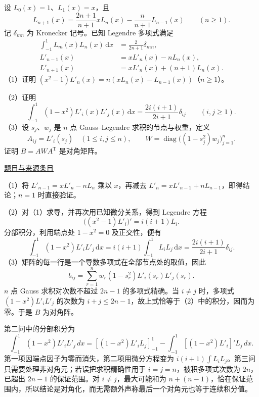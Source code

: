\documentclass[12pt,fontset=fandol]{ctexart}
\begin{document}
\begin{example}\label{ex:fin16-high:13}\label{pr:fin16-high:13}

设 $L_0(x)=1$、$L_1(x)=x$，且
\[
L_{n+1}(x)=\frac{2n+1}{n+1}xL_n(x)-\frac{n}{n+1}L_{n-1}(x)
\qquad(n\ge1).
\]
记 $\delta_{mn}$ 为 Kronecker 记号。已知 Legendre 多项式满足
\[
\begin{aligned}
\int_{-1}^1L_m(x)L_n(x)\,\mathrm dx&=\frac{2}{2n+1}\delta_{mn},\\
L'_{n-1}(x)&=xL'_n(x)-nL_n(x),\\
L'_{n+1}(x)&=xL'_n(x)+(n+1)L_n(x).
\end{aligned}
\]
（1）证明 $(x^2-1)L'_n(x)=n(xL_n(x)-L_{n-1}(x))$（$n\ge1$）。

（2）证明
\[
\int_{-1}^1(1-x^2)L'_i(x)L'_j(x)\,\mathrm dx
=\frac{2i(i+1)}{2i+1}\delta_{ij}\qquad(i,j\ge1).
\]
（3）设 $s_j$、$w_j$ 是 $n$ 点 Gauss--Legendre 求积的节点与权重，定义
\[
A_{ij}=L'_i(s_j)\quad(1\le i,j\le n),\qquad
W=\operatorname{diag}\bigl((1-s_j^2)w_j\bigr)_{j=1}^n.
\]
证明 $B=AWA^{\mathrm T}$ 是对角矩阵。

\par\href{https://github.com/lzxcr/cmc-mathematics/blob/64916fa1fdbc3e444a652eca204d5669058ee321/src/problems/finals/16/16.md}{题目与来源条目}

\end{example}

\begin{solve}\label{ans:fin16-high:13}

（1）将 $L'_{n-1}=xL'_n-nL_n$ 乘以 $x$，再减去 $L'_n=xL'_{n-1}+nL_{n-1}$，即得结论；$n=1$ 时直接验证。

（2）对（1）求导，并再次用已知微分关系，得到 Legendre 方程
\[
\bigl((x^2-1)L'_i\bigr)'=i(i+1)L_i.
\]
分部积分，利用端点处 $1-x^2=0$ 及正交性，便有
\[
\int_{-1}^1(1-x^2)L'_iL'_j\,\mathrm dx
=i(i+1)\int_{-1}^1L_iL_j\,\mathrm dx
=\frac{2i(i+1)}{2i+1}\delta_{ij}.
\]
（3）矩阵的每一行是一个导数多项式在全部节点处的取值，因此
\[
b_{ij}=\sum_{r=1}^nw_r(1-s_r^2)L'_i(s_r)L'_j(s_r).
\]
$n$ 点 Gauss 求积对次数不超过 $2n-1$ 的多项式精确。当 $i\ne j$ 时，多项式 $(1-x^2)L'_iL'_j$ 的次数为 $i+j\le2n-1$，故上式恰等于（2）中的积分，因而为零。于是 $B$ 为对角阵。

第二问中的分部积分为
\[
\int_{-1}^1(1-x^2)L'_iL'_j\,dx
=[(1-x^2)L'_iL_j]_{-1}^1-\int_{-1}^1[(1-x^2)L'_i]'L_j\,dx.
\]
第一项因端点因子为零而消失，第二项用微分方程变为 $i(i+1)\int L_iL_j$。第三问只需要处理非对角元；若误把求积精确性用于 $i=j=n$，被积多项式次数为 $2n$，已超出 $2n-1$ 的保证范围。对 $i\ne j$，最大可能和为 $n+(n-1)$，恰在保证范围内，所以结论是对角化，而无需额外声称最后一个对角元也等于连续积分值。

\end{solve}
\end{document}
